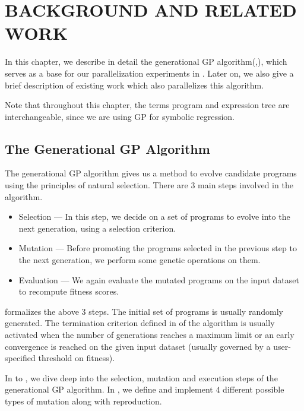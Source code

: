 \chapter{BACKGROUND AND RELATED WORK}
\label{chap:bgrw}
In this chapter, we describe in detail the generational GP algorithm(\citep{poli08:fieldguide},\citep{RFIgp2016}), which serves as a base for our parallelization experiments in . Later on, we also give a brief description of existing work which also parallelizes this algorithm.

Note that throughout this chapter, the terms program and expression tree are interchangeable, since we are using GP for symbolic regression. 

\section{The Generational GP Algorithm}
\label{bgrw:algo}
The generational GP algorithm gives us a method to evolve candidate programs using the principles of natural selection. There are $3$ main steps involved in the algorithm. 
\begin{itemize}
  \item Selection --- In this step, we decide on a set of programs to evolve into the next generation, using a selection criterion. 
  \item Mutation --- Before promoting the programs selected in the previous step to the next generation, we perform some genetic operations on them. 
  \item Evaluation --- We again evaluate the mutated programs on the input dataset to recompute fitness scores. 
\end{itemize}

 formalizes the above $3$ steps. The initial set of programs is usually randomly generated. The termination criterion defined in  of the algorithm is usually activated when the number of generations reaches a maximum limit or an early convergence is reached on the given input dataset (usually governed by a user-specified threshold on fitness).

In  to , we dive deep into the selection, mutation and execution steps of the generational GP algorithm. In , we define and implement $4$ different possible types of mutation along with reproduction.


